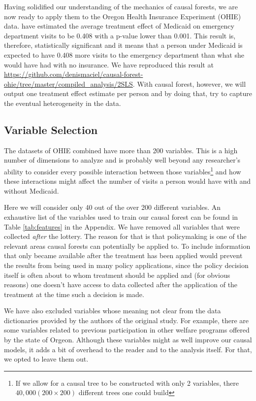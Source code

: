 Having solidified our understanding of the mechanics of causal forests, we are now ready to apply them to the Oregon Health Insurance Experiment (OHIE) data. \cite{taubmanMedicaidIncreasesEmergencyDepartment2014} have estimated the average treatment effect of Medicaid on emergency department visits to be 0.408 with a p-value lower than 0.001. This result is, therefore, statistically significant and it means that a person under Medicaid is expected to have 0.408 more visits to the emergency department  than what she would have had with no insurance. We have reproduced this result at \url{https://github.com/denismaciel/causal-forest-ohie/tree/master/compiled_analysis/2SLS}. With causal forest, however, we will output one treatment effect estimate per person and by doing that, try to capture the eventual heterogeneity in the data.

\subsection{Variable Selection}

The datasets of OHIE combined have more than 200 variables. This is a high number of dimensions to analyze and is probably well beyond any researcher's ability to consider every possible interaction between those variables\footnote{If we allow for a causal tree to be constructed with only 2 variables, there $40,000 (200 \times 200)$ different trees one could build} and how these interactions might affect the number of visits a person would have with and without Medicaid. 

Here we will consider only 40 out of the over 200 different variables. An exhaustive list of the variables used to train our causal forest can be found in Table \ref{tab:features} in the Appendix. We have removed all variables that were collected \textit{after} the lottery. The reason for that is that policymaking is one of the relevant areas causal forests can potentially be applied to. To include information that only became available after the treatment has been applied would prevent the results from being used in many policy applications, since the policy decision itself is often about to whom treatment should be applied and (for obvious reasons) one doesn't have access to data collected after the application of the treatment at the time such a decision is made.

We have also excluded variables whose meaning not clear from the data dictionaries provided by the authors of the original study. For example, there are some variables related to previous participation in other welfare programs offered by the state of Orgeon. Although these variables might as well improve our causal models, it adds a bit of overhead to the reader and to the analysis itself. For that, we opted to leave them out. %


